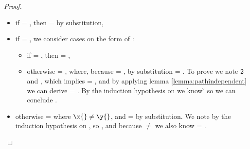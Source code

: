 \begin{lemma}
\begin{proof}
\begin{case}[T-App]
\begin{itemize}
\begin{subcase}[B-BetaClosure]
         \begin{itemize}
           \item if  = \emptyobject{}, then \object{} = \emptyobject{} by substitution,
           \item if  = { {\x{}}}, 
             we consider cases on the form of :
             \begin{itemize}
               \item if  = \emptyobject{}, then \object{} = \emptyobject{},
               \item otherwise  = { {\y{}}}, where,
                 because
                \object{} = {
                                         {}
                                         {\x{}}},
                 by substitution
                 \object{} = { {}}.
                 To prove \inopenv{\openv{}}{\object{}}{\v{}}
                 we note 
                          {\x{}}
                          {\v{2}}
                          and 
                 ,
                 which implies 
                  = 
                 ,
                 and by applying lemma \ref{lemma:pathindependent}
                 we can derive
                  =
                             { {\x{}}}.
                 By the induction hypothesis on {}
                 we know
                          { {\x{}}}
                          {\v{}}
                 so we can conclude
                 .

             \end{itemize}
           \item otherwise  = { {\y{}}} where $\x{} \not= \y{}$,
             and \object{} =  by substitution.
             We note  
             by the induction hypothesis on {},
             so 
             ,
           and because {\x{}} $\not=$ {\y{}}
            we also know
              = 
             \inopenvnoeq{\openv{}}{\y{}}.


\end{itemize}
\end{subcase}
\end{itemize}
\end{case}
\end{proof}
\end{lemma}
